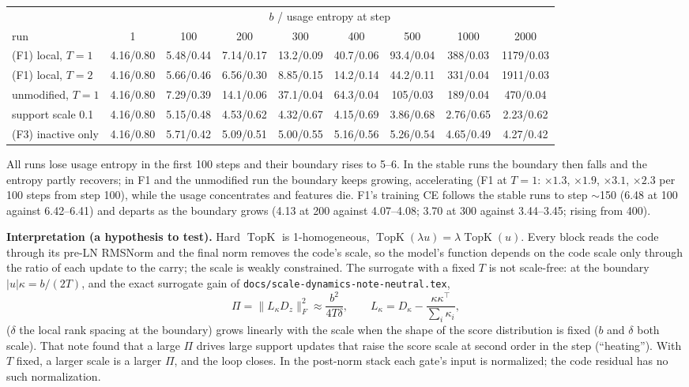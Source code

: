 \documentclass[11pt,a4paper]{article}
\newcommand{\code}[1]{\texttt{#1}}
\newcommand{\topk}{\operatorname{TopK}}
\begin{document}
\begin{center}\small
\begin{tabular}{lcccccccc}
\toprule
 & \multicolumn{8}{c}{\(b\) \;/\; usage entropy at step} \\
run & 1 & 100 & 200 & 300 & 400 & 500 & 1000 & 2000 \\
\midrule
(F1) local, \(T=1\) & 4.16/0.80 & 5.48/0.44 & 7.14/0.17 & 13.2/0.09 & 40.7/0.06 & 93.4/0.04 & 388/0.03 & 1179/0.03 \\
(F1) local, \(T=2\) & 4.16/0.80 & 5.66/0.46 & 6.56/0.30 & 8.85/0.15 & 14.2/0.14 & 44.2/0.11 & 331/0.04 & 1911/0.03 \\
unmodified, \(T=1\) & 4.16/0.80 & 7.29/0.39 & 14.1/0.06 & 37.1/0.04 & 64.3/0.04 & 105/0.03 & 189/0.04 & 470/0.04 \\
support scale 0.1   & 4.16/0.80 & 5.15/0.48 & 4.53/0.62 & 4.32/0.67 & 4.15/0.69 & 3.86/0.68 & 2.76/0.65 & 2.23/0.62 \\
(F3) inactive only  & 4.16/0.80 & 5.71/0.42 & 5.09/0.51 & 5.00/0.55 & 5.16/0.56 & 5.26/0.54 & 4.65/0.49 & 4.27/0.42 \\
\bottomrule
\end{tabular}
\end{center}

All runs lose usage entropy in the first 100 steps and their boundary rises to 5--6.  In the stable runs the
boundary then falls and the entropy partly recovers; in F1 and the unmodified run the boundary keeps growing,
accelerating (F1 at \(T=1\): \(\times1.3\), \(\times1.9\), \(\times3.1\), \(\times2.3\) per 100 steps from step 100), while the
usage concentrates and features die.  F1's training CE follows the stable runs to step \(\sim\)150 (6.48 at 100
against 6.42--6.41) and departs as the boundary grows (4.13 at 200 against 4.07--4.08; 3.70 at 300 against
3.44--3.45; rising from 400).

\textbf{Interpretation (a hypothesis to test).}  Hard \(\topk\) is 1-homogeneous, \(\topk(\lambda u)=\lambda\topk(u)\).
Every block reads the code through its pre-LN RMSNorm and the final norm removes the code's scale, so the model's
function depends on the code scale only through the ratio of each update to the carry; the scale is weakly
constrained.  The surrogate with a fixed \(T\) is not scale-free: at the boundary \(|u|\kappa=b/(2T)\), and the exact
surrogate gain of \code{docs/scale-dynamics-note-neutral.tex},
\begin{equation}
  \Pi=\bigl\lVert L_\kappa D_z\bigr\rVert_F^2\approx\frac{b^2}{4T\delta},\qquad
  L_\kappa=D_\kappa-\frac{\kappa\kappa^\top}{\sum_i\kappa_i},
\end{equation}
(\(\delta\) the local rank spacing at the boundary) grows linearly with the scale when the shape of the score
distribution is fixed (\(b\) and \(\delta\) both scale).  That note found that a large \(\Pi\) drives large support
updates that raise the score scale at second order in the step (``heating'').  With \(T\) fixed, a larger scale is a
larger \(\Pi\), and the loop closes.  In the post-norm stack each gate's input is normalized; the code residual has
no such normalization.
\end{document}
